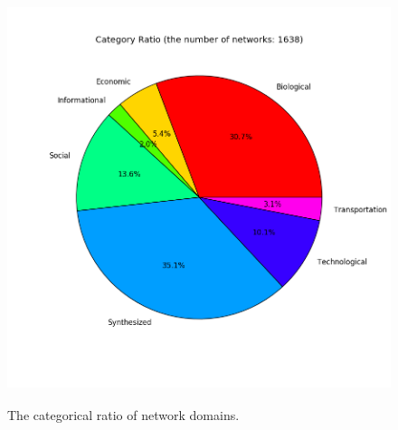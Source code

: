 \documentclass{article}
\begin{document}
	
	\begin{figure}[ht]
	\begin{center}
		\vspace{0.5cm}
		\includegraphics[clip,width=12cm,height = 12cm]{figs/category_ratio.png}
		\vspace{0.5cm}
		\caption{The categorical ratio of network domains.}
		\label{domain_ratio}
	\end{center}
	\end{figure}
	
\end{document}
